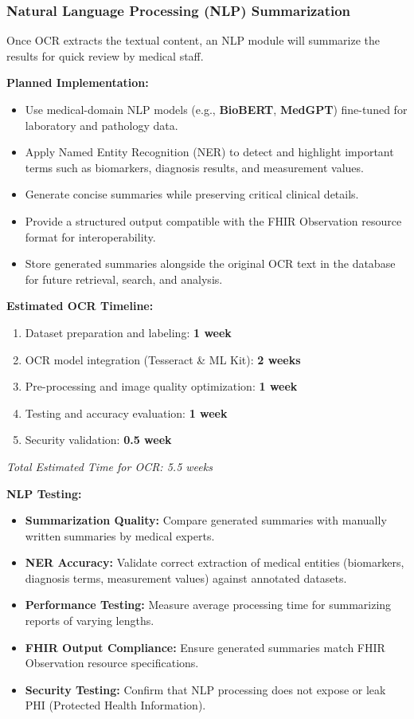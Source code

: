 \documentclass[a4paper, 12pt]{article}
\begin{document}
\subsubsection{Natural Language Processing (NLP) Summarization}

Once OCR extracts the textual content, an NLP module will summarize the results for quick review by medical staff.

\textbf{Planned Implementation:}
\begin{itemize}
    \item Use medical-domain NLP models (e.g., \textbf{BioBERT}, \textbf{MedGPT}) fine-tuned for laboratory and pathology data.
    \item Apply Named Entity Recognition (NER) to detect and highlight important terms such as biomarkers, diagnosis results, and measurement values.
    \item Generate concise summaries while preserving critical clinical details.
    \item Provide a structured output compatible with the FHIR Observation resource format for interoperability.
    \item Store generated summaries alongside the original OCR text in the database for future retrieval, search, and analysis.
\end{itemize}
\newpage
\textbf{Estimated OCR Timeline:}
\begin{enumerate}
    \item Dataset preparation and labeling: \textbf{1 week}
    \item OCR model integration (Tesseract \& ML Kit): \textbf{2 weeks}
    \item Pre-processing and image quality optimization: \textbf{1 week}
    \item Testing and accuracy evaluation: \textbf{1 week}
    \item Security validation: \textbf{0.5 week}
\end{enumerate}
\textit{Total Estimated Time for OCR: 5.5 weeks}

\textbf{NLP Testing:}
\begin{itemize}
    \item \textbf{Summarization Quality:} Compare generated summaries with manually written summaries by medical experts.
    \item \textbf{NER Accuracy:} Validate correct extraction of medical entities (biomarkers, diagnosis terms, measurement values) against annotated datasets.
    \item \textbf{Performance Testing:} Measure average processing time for summarizing reports of varying lengths.
    \item \textbf{FHIR Output Compliance:} Ensure generated summaries match FHIR Observation resource specifications.
    \item \textbf{Security Testing:} Confirm that NLP processing does not expose or leak PHI (Protected Health Information).
\end{itemize}
\end{document}
